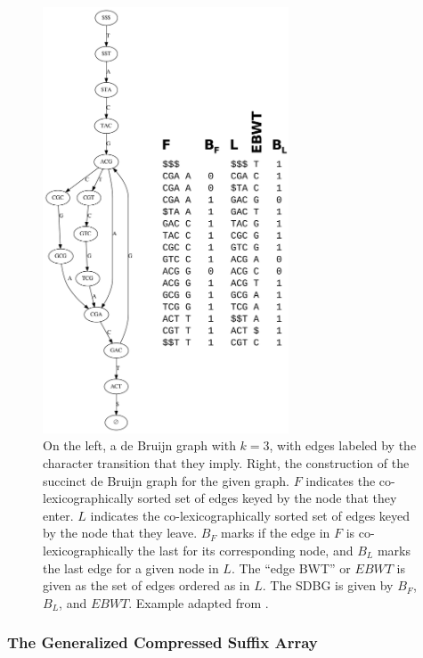 \begin{figure}[htbp!]
  \centering
  \includegraphics[width=0.65\textwidth]{Chapter2/Figs/sdbg_construction.pdf}
  \caption[Succinct de Bruijn graph construction]{
    On the left, a de Bruijn graph with $k=3$, with edges labeled by the character transition that they imply.
    Right, the construction of the succinct de Bruijn graph for the given graph.
    $F$ indicates the co-lexicographically sorted set of edges keyed by the node that they enter.
    $L$ indicates the co-lexicographically sorted set of edges keyed by the node that they leave.
    $B_{F}$ marks if the edge in $F$ is co-lexicographically the last for its corresponding node, and $B_{L}$ marks the last edge for a given node in $L$.
    The ``edge BWT'' or $EBWT$ is given as the set of edges ordered as in $L$.
    The SDBG is given by $B_F$, $B_L$, and $EBWT$.
    Example adapted from \cite{muggli2017succinct}.
  }
  \label{fig:sdbg}
\end{figure}


\subsubsection{The Generalized Compressed Suffix Array}

